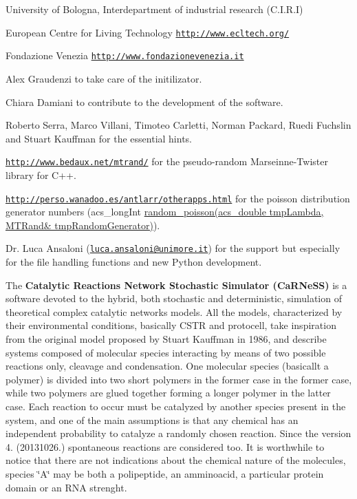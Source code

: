 \begin{DoxyItemize}
\item University of Bologna, Interdepartment of industrial research (C.\-I.\-R.\-I)
\item European Centre for Living Technology \href{http://www.ecltech.org/}{\tt http\-://www.\-ecltech.\-org/}
\item Fondazione Venezia \href{http://www.fondazionevenezia.it}{\tt http\-://www.\-fondazionevenezia.\-it}
\item Alex Graudenzi to take care of the initilizator.
\item Chiara Damiani to contribute to the development of the software.
\item Roberto Serra, Marco Villani, Timoteo Carletti, Norman Packard, Ruedi Fuchslin and Stuart Kauffman for the essential hints.
\item \href{http://www.bedaux.net/mtrand/}{\tt http\-://www.\-bedaux.\-net/mtrand/} for the pseudo-\/random Marseinne-\/\-Twister library for C++.
\item \href{http://perso.wanadoo.es/antlarr/otherapps.html}{\tt http\-://perso.\-wanadoo.\-es/antlarr/otherapps.\-html} for the poisson distribution generator numbers (acs\-\_\-long\-Int \hyperlink{a00059_a22cddb6ffcf2250e0c90bc913728350f}{random\-\_\-poisson(acs\-\_\-double tmp\-Lambda, M\-T\-Rand\& tmp\-Random\-Generator)}).
\item Dr. Luca Ansaloni (\href{mailto:luca.ansaloni@unimore.it}{\tt luca.\-ansaloni@unimore.\-it}) for the support but especially for the file handling functions and new Python development.



 The {\bfseries Catalytic Reactions Network Stochastic Simulator (Ca\-R\-Ne\-S\-S)} is a software devoted to the hybrid, both stochastic and deterministic, simulation of theoretical complex catalytic networks models. All the models, characterized by their environmental conditions, basically C\-S\-T\-R and protocell, take inspiration from the original model proposed by Stuart Kauffman in 1986, and describe systems composed of molecular species interacting by means of two possible reactions only, cleavage and condensation. One molecular species (basicallt a polymer) is divided into two short polymers in the former case in the former case, while two polymers are glued together forming a longer polymer in the latter case. Each reaction to occur must be catalyzed by another species present in the system, and one of the main assumptions is that any chemical has an independent probability to catalyze a randomly chosen reaction. Since the version 4. (20131026.) spontaneous reactions are considered too. It is worthwhile to notice that there are not indications about the chemical nature of the molecules, species \char`\"{}\-A\char`\"{} may be both a polipeptide, an amminoacid, a particular protein domain or an R\-N\-A strenght.\par
\par
 

\end{DoxyItemize}
